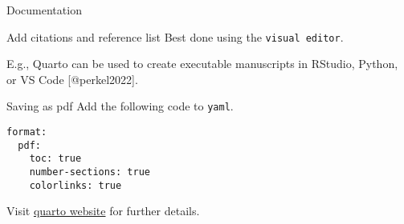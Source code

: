 \documentclass[
  ignorenonframetext,
  aspectratio=169,
]{beamer}
\begin{document}
\begin{frame}[fragile]{Documentation}
\begin{block}{Add citations and reference list}
\label{add-citations-and-reference-list}
Best done using the \texttt{visual\ editor}.

E.g., Quarto can be used to create executable manuscripts in RStudio,
Python, or VS Code {[}@perkel2022{]}.
\end{block}

\begin{block}{Saving as pdf}
\label{saving-as-pdf}
Add the following code to \texttt{yaml}.

\begin{verbatim}
format:
  pdf:
    toc: true
    number-sections: true
    colorlinks: true
\end{verbatim}

Visit
\href{https://quarto.org/docs/output-formats/pdf-basics.html}{quarto
website} for further details.
\end{block}
\end{frame}
\end{document}
